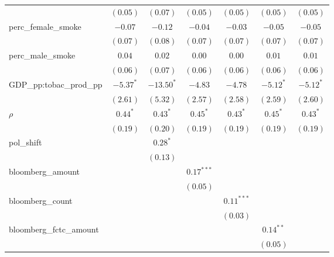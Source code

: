 \begin{table}[!h]
\begin{center}
\begin{tabular}{l c c c c c c }
                        & $(0.05)$      & $(0.07)$     & $(0.05)$      & $(0.05)$     & $(0.05)$      & $(0.05)$      \\
perc\_female\_smoke     & $-0.07$       & $-0.12$      & $-0.04$       & $-0.03$      & $-0.05$       & $-0.05$       \\
                        & $(0.07)$      & $(0.08)$     & $(0.07)$      & $(0.07)$     & $(0.07)$      & $(0.07)$      \\
perc\_male\_smoke       & $0.04$        & $0.02$       & $0.00$        & $0.00$       & $0.01$        & $0.01$        \\
                        & $(0.06)$      & $(0.07)$     & $(0.06)$      & $(0.06)$     & $(0.06)$      & $(0.06)$      \\
GDP\_pp:tobac\_prod\_pp & $-5.37^{*}$   & $-13.50^{*}$ & $-4.83$       & $-4.78$      & $-5.12^{*}$   & $-5.12^{*}$   \\
                        & $(2.61)$      & $(5.32)$     & $(2.57)$      & $(2.58)$     & $(2.59)$      & $(2.60)$      \\
$\rho$                  & $0.44^{*}$    & $0.43^{*}$   & $0.45^{*}$    & $0.43^{*}$   & $0.45^{*}$    & $0.43^{*}$    \\
                        & $(0.19)$      & $(0.20)$     & $(0.19)$      & $(0.19)$     & $(0.19)$      & $(0.19)$      \\
pol\_shift              &               & $0.28^{*}$   &               &              &               &               \\
                        &               & $(0.13)$     &               &              &               &               \\
bloomberg\_amount       &               &              & $0.17^{***}$  &              &               &               \\
                        &               &              & $(0.05)$      &              &               &               \\
bloomberg\_count        &               &              &               & $0.11^{***}$ &               &               \\
                        &               &              &               & $(0.03)$     &               &               \\
bloomberg\_fctc\_amount &               &              &               &              & $0.14^{**}$   &               \\
                        &               &              &               &              & $(0.05)$      &               \\

\end{tabular}
\end{center}
\end{table}
